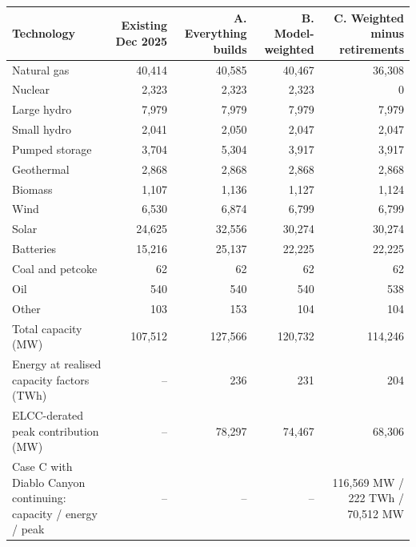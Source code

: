 \begin{tabular}{lrrrr}
\toprule
Technology & Existing Dec 2025 & A. Everything builds & B. Model-weighted & C. Weighted minus retirements \\
\midrule
Natural gas & 40,414 & 40,585 & 40,467 & 36,308 \\
Nuclear & 2,323 & 2,323 & 2,323 & 0 \\
Large hydro & 7,979 & 7,979 & 7,979 & 7,979 \\
Small hydro & 2,041 & 2,050 & 2,047 & 2,047 \\
Pumped storage & 3,704 & 5,304 & 3,917 & 3,917 \\
Geothermal & 2,868 & 2,868 & 2,868 & 2,868 \\
Biomass & 1,107 & 1,136 & 1,127 & 1,124 \\
Wind & 6,530 & 6,874 & 6,799 & 6,799 \\
Solar & 24,625 & 32,556 & 30,274 & 30,274 \\
Batteries & 15,216 & 25,137 & 22,225 & 22,225 \\
Coal and petcoke & 62 & 62 & 62 & 62 \\
Oil & 540 & 540 & 540 & 538 \\
Other & 103 & 153 & 104 & 104 \\
\midrule
Total capacity (MW) & 107,512 & 127,566 & 120,732 & 114,246 \\
Energy at realised capacity factors (TWh) & -- & 236 & 231 & 204 \\
ELCC-derated peak contribution (MW) & -- & 78,297 & 74,467 & 68,306 \\
Case C with Diablo Canyon continuing: capacity / energy / peak & -- & -- & -- & 116,569 MW / 222 TWh / 70,512 MW \\
\bottomrule
\end{tabular}